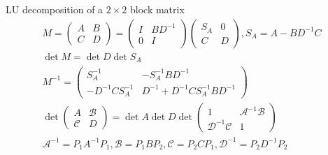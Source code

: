 \documentclass[11pt,aspectratio=43]{beamer}
\begin{document}
\appendix

\begin{frame}{LU decomposition of a $2\times 2$ block matrix}
  \begin{gather*}
      M = \begin{pmatrix} A & B \\ C & D \end{pmatrix}
      = \begin{pmatrix} I & BD^{-1} \\ 0 & I \end{pmatrix}
      \begin{pmatrix} S_A & 0 \\ C & D \end{pmatrix}, S_A = A-B D^{-1} C \\
      \det M = \det D \det S_A \\
      M^{-1} = \begin{pmatrix} S_A^{-1} & -S_A^{-1} B D^{-1} \\ -D^{-1}C S_A^{-1} & D^{-1}+D^{-1} C S_A^{-1} B D^{-1} \end{pmatrix} \\
      \det \begin{pmatrix} A & \mathcal{B} \\ \mathcal{C} & D \end{pmatrix} = \det A \det D \det \begin{pmatrix} 1 & \mathcal{A}^{-1} \mathcal{B} \\ \mathcal{D}^{-1} \mathcal{C} & 1 \end{pmatrix} \\
      \mathcal{A}^{-1} = P_1 A^{-1} P_1, \mathcal{B} = P_1 B P_2, \mathcal{C} = P_2 C P_1, \mathcal{D}^{-1} = P_2 D^{-1} P_2
  \end{gather*}
\end{frame}


%  
%  

\end{document}
